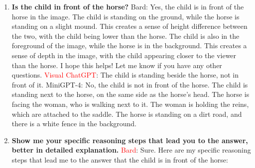 \begin{enumerate}
        The child is standing on the ground, while the horse is standing on a slight mound. This creates a sense of height difference between the two, with the child being lower than the horse.
        The child is wearing a blue shirt and jeans, while the horse is a brown horse with a white mane and tail. This creates a contrast in color between the two, with the child being lighter in color than the horse.
        The child is in the foreground of the image, while the horse is in the background. This creates a sense of depth in the image, with the child appearing closer to the viewer than the horse.
        I hope this helps! Let me know if you have any other questions.
        \subitem \textcolor{red}{Visual ChatGPT}: The woman is walking the horse, with the child standing beside them.
        \subitem MiniGPT-4: The image shows a woman walking next to a horse. The woman is wearing a black helmet and black pants, and the horse is wearing a brown saddle and black bridle. The woman is holding the reins of the horse, which are attached to the saddle. The horse is standing on a dirt road, and there is a white fence in the background.
        \item \textbf{Is the child in front of the horse?}
        \subitem Bard: Yes, the child is in front of the horse in the image. The child is standing on the ground, while the horse is standing on a slight mound. This creates a sense of height difference between the two, with the child being lower than the horse. The child is also in the foreground of the image, while the horse is in the background. This creates a sense of depth in the image, with the child appearing closer to the viewer than the horse.
        I hope this helps! Let me know if you have any other questions.
        \subitem \textcolor{red}{Visual ChatGPT}: The child is standing beside the horse, not in front of it.
        \subitem MiniGPT-4: No, the child is not in front of the horse. The child is standing next to the horse, on the same side as the horse’s head. The horse is facing the woman, who is walking next to it. The woman is holding the reins, which are attached to the saddle. The horse is standing on a dirt road, and there is a white fence in the background.
        \item \textbf{Show me your specific reasoning steps that lead you to the answer, better in detailed explanation.}
        \subitem \textcolor{Red}{Bard}: Sure. Here are my specific reasoning steps that lead me to the answer that the child is in front of the horse:


\end{enumerate}
